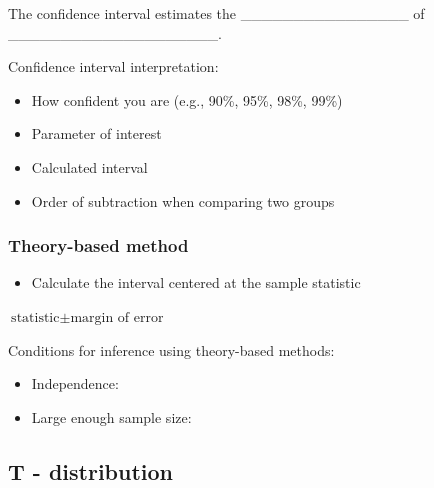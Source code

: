 \documentclass[
]{report}
\providecommand{\tightlist}{%
  \setlength{\itemsep}{0pt}\setlength{\parskip}{0pt}}
\newcommand{\rgi}{\hspace{24pt}}  %
\begin{document}
The confidence interval estimates the \_\_\_\_\_\_\_\_\_\_\_\_\_\_\_\_
of \_\_\_\_\_\_\_\_\_\_\_\_\_\_\_\_\_\_\_\_.

Confidence interval interpretation:

\begin{itemize}
\item
  How confident you are (e.g., 90\%, 95\%, 98\%, 99\%)
\item
  Parameter of interest
\item
  Calculated interval
\item
  Order of subtraction when comparing two groups
\end{itemize}

\vspace{0.8in}

\newpage

\subsubsection*{Theory-based method}\label{theory-based-method-2}

\begin{itemize}
\tightlist
\item
  Calculate the interval centered at the sample statistic
\end{itemize}

\rgi \(\text{statistic} \pm \text{margin of error}\)

\vspace{0.5in}

Conditions for inference using theory-based methods:

\begin{itemize}
\tightlist
\item
  Independence:
\end{itemize}

\vspace{0.2in}

\begin{itemize}
\tightlist
\item
  Large enough sample size:
\end{itemize}

\vspace{0.2in}

\subsection*{T - distribution}\label{t---distribution}
\end{document}

